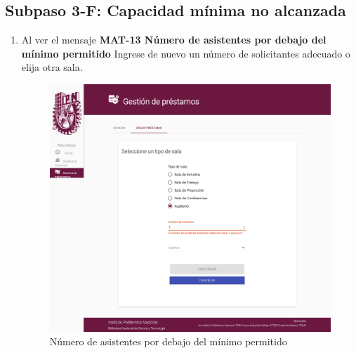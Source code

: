 \subsection{Subpaso 3-F: Capacidad mínima no alcanzada}
\begin{enumerate}
	\item Al ver el mensaje
\textbf{MAT-13 Número de asistentes por debajo del mínimo permitido} Ingrese de nuevo un número de solicitantes adecuado o elija otra sala.
	  \begin{figure}[hbtp]
	\includegraphics[scale=0.3]{images/Interfaz/MAT-13 Número de asistentes por debajo del mínimo permitido.png}
	\caption{Número de asistentes por debajo del mínimo permitido}
	\end{figure}
\end{enumerate}
